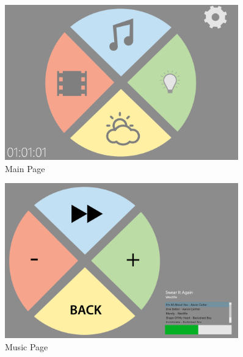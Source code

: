 \begin{figure}[H]
	\centering
	\includegraphics[width=0.9\textwidth]{chapter6/pagemain.png}
	\caption{Main Page}
	\label{fig:main}
\end{figure}
\begin{figure}[H]
		\centering
	\includegraphics[width=0.9\textwidth]{chapter6/pagemusic.png}
	\caption{Music Page}
	\label{fig:music}
\end{figure}

